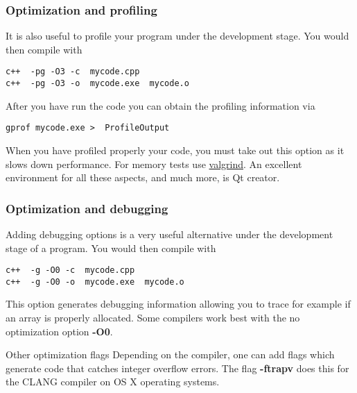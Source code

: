 \documentclass{beamer}
\begin{document}
\begin{frame}
\frametitle{Optimization and profiling}

\begin{block}{}
It is also useful to profile your program under the development stage.
You would then compile with 
\begin{verbatim}
c++  -pg -O3 -c  mycode.cpp
c++  -pg -O3 -o  mycode.exe  mycode.o
\end{verbatim}
After you have run the code you can obtain the profiling information via
\begin{verbatim}
gprof mycode.exe >  ProfileOutput
\end{verbatim}
When you have profiled properly your code, you must take out this option as it 
slows down performance.
For memory tests use \href{{http://www.valgrind.org}}{valgrind}. An excellent environment for all these aspects, and much  more, is  Qt creator.

\end{block}
\end{frame}

\begin{frame}
\frametitle{Optimization and debugging}

\begin{block}{}
Adding debugging options is a very useful alternative under the development stage of a program.
You would then compile with 
\begin{verbatim}
c++  -g -O0 -c  mycode.cpp
c++  -g -O0 -o  mycode.exe  mycode.o
\end{verbatim}
This option generates debugging information allowing you to trace for example if an array is properly allocated. Some compilers work best with the no optimization option \textbf{-O0}. 
\end{block}
\begin{block}{Other optimization flags  }
Depending on the compiler, one can add flags which generate code that catches integer overflow errors. 
The flag \textbf{-ftrapv} does this for the CLANG compiler on OS X operating systems.   
\end{block}
\end{frame}
\end{document}
